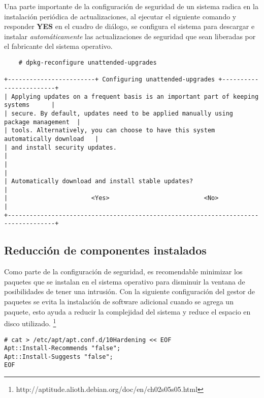 Una parte importante de la configuraci\'{o}n de seguridad de un sistema radica en la instalaci\'{o}n peri\'{o}dica de actualizaciones, al ejecutar el siguiente comando y responder \textbf{YES} en el cuadro de di\'{a}logo, se configura el sistema para descargar e instalar \emph{autom\'{a}ticamente} las actualizaciones de seguridad que sean liberadas por el fabricante del sistema operativo.

{
\scriptsize
\linespread{1}
\begin{verbatim}
    # dpkg-reconfigure unattended-upgrades

+------------------------+ Configuring unattended-upgrades +------------------------+
| Applying updates on a frequent basis is an important part of keeping systems      |
| secure. By default, updates need to be applied manually using package management  |
| tools. Alternatively, you can choose to have this system automatically download   |
| and install security updates.                                                     |
|                                                                                   |
| Automatically download and install stable updates?                                |
|                       <Yes>                          <No>                         |
+-----------------------------------------------------------------------------------+
\end{verbatim}
}

      \subsection {Reducci\'{o}n de componentes instalados}

Como parte de la configuraci\'{o}n de seguridad, es recomendable minimizar los paquetes que se instalan en el sistema operativo para disminuir la ventana de posibilidades de tener una intrusi\'{o}n. Con la siguiente configuraci\'{o}n del gestor de paquetes se evita la instalaci\'{o}n de software adicional cuando se agrega un paquete, esto ayuda a reducir la complejidad del sistema y reduce el espacio en disco utilizado. \footnote{http://aptitude.alioth.debian.org/doc/en/ch02s05s05.html}

{
\scriptsize
\linespread{1}
\begin{verbatim}
# cat > /etc/apt/apt.conf.d/10Hardening << EOF
Apt::Install-Recommends "false";
Apt::Install-Suggests "false";
EOF

\end{verbatim}
}


